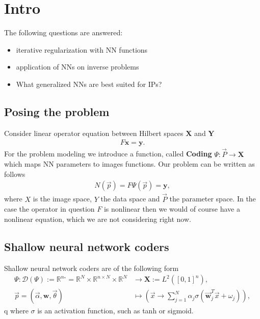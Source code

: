 




\maketitle

\tableofcontents

\section{Intro}
The following questions are answered:
\begin{itemize}
    \item iterative regularization with NN functions
    \item application of NNs on inverse problems
    \item What generalized NNs are best suited for IPs?
\end{itemize}

\subsection{Posing the problem}
Consider linear operator equation between Hilbert spaces $\mathbf{X}$ and
$\mathbf{Y}$
\begin{align}
    F\mathbf{x} = \mathbf{y}.
\end{align}
For the problem modeling we introduce a function, called \textbf{Coding}
$\Psi: \vec{P} \to \mathbf{X}$ which maps NN parameters to images functions.
Our problem can be written as follows
\begin{align}
    N(\vec{p}) = F\Psi(\vec{p}) = \mathbf{y},
\end{align}
where $X$ is the image space, $Y$ the data space and $\vec{P}$ the parameter
space. In the case the operator in question $F$ is nonlinear then we would of
course have a nonlinear equation, which we are not considering right now.

\subsection{Shallow neural network coders}
Shallow neural network coders are of the following form
\begin{align}
    \Psi:
    \mathcal{D}(\Psi) := \mathbb{R}^{n_*} =
    \mathbb{R}^{N}\times \mathbb{R}^{n \times N}
    \times \mathbb{R}^{N}
    &\to \mathbf{X} :=
    L^{2}\left([0, 1]^{n}\right),\\
    \vec{p} = (\vec{\alpha}, \mathbf{w}, \vec{\theta}) &\mapsto
    \left(\vec{x} \to \sum_{j=1}^{N} \alpha_j\sigma\left(
    \vec{\mathbf{w}}_j^{T}\vec{x} + \omega_j \right)  \right),
\end{align}q
where $\sigma$ is an activation function, such as tanh or sigmoid.

